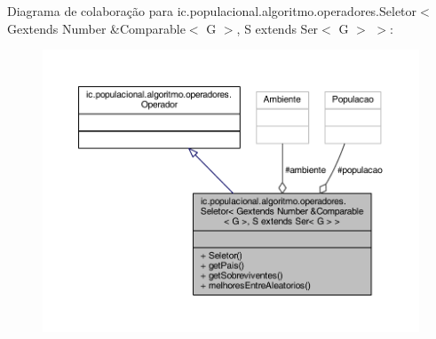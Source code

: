 Diagrama de colaboração para ic.\-populacional.\-algoritmo.\-operadores.\-Seletor$<$ Gextends Number \&Comparable$<$ G $>$, S extends Ser$<$ G $>$ $>$\-:\nopagebreak
\begin{figure}[H]
\begin{center}
\leavevmode
\includegraphics[width=350pt]{classic_1_1populacional_1_1algoritmo_1_1operadores_1_1_seletor_3_01_gextends_01_number_01_6_compe368e97dd18dca8fab284e777d22d00c}
\end{center}
\end{figure}
